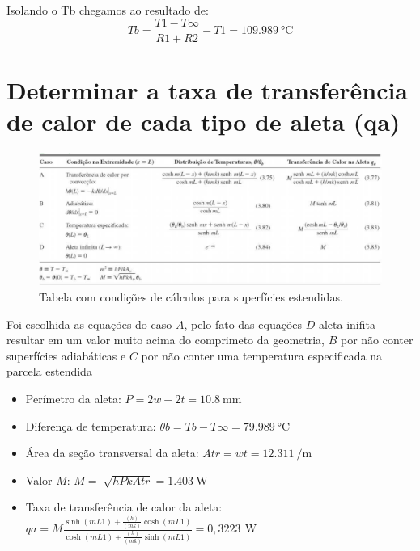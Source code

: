Isolando o Tb chegamos ao resultado de:
\begin{equation}
    {Tb}={\frac{T1 -T\infty}{{R1}+{R2}}}-{T1} = \SI{109,989}{\degreeCelsius}
\end{equation}

\clearpage

\section{Determinar a taxa de transferência de calor de cada tipo de aleta (qa)}\label{sec:calcTable}

\begin{figure}[h]
    \centering
    \caption{Tabela com condições de cálculos para superfícies estendidas.}
    \label{fig:tabelaCasosCalc}
    \includegraphics[width=15cm]{figuras/tabelaCasosCalc.jpg}
    \fonteproprioautor
\end{figure}

Foi escolhida as equações do caso \(A\), pelo fato das equações
\(D\) aleta inifita resultar em um valor muito acima do comprimeto da
geometria,
\(B\) por não conter superfícies adiabáticas
e \(C\) por não conter uma temperatura especificada na parcela estendida
\begin{itemize}[leftmargin=2cm]
    \item Perímetro da aleta: \(
          {P}={2w+2t} = \SI{10,8}{\milli\meter}
          \)
    \item Diferença de temperatura: \(
          {\theta}b={{Tb}-{T\infty}} = \SI{79,989}{\degreeCelsius}
          \)
    \item Área da seção transversal da aleta: \(
          {Atr}={{w}{t}} = \SI{12,311}{\per\meter}
          \)
    \item Valor \(M\): \(
          {M}={\sqrt[]{{h}{P}{k}{Atr}}} = \SI{1,403}{\watt}
          \)
    \item Taxa de transferência
          de calor da aleta: \\\(
          {qa}={M}{
          \frac
          {\sinh{(mL1)}+{\frac{(h)}{(mk)}}{\cosh{(mL1)}}}
          {\cosh{(mL1)}+{\frac{(h)}{(mk)}}{\sinh{(mL1)}}}
          }={0,3223\,\SI{}{\watt}}
          \)
\end{itemize}

